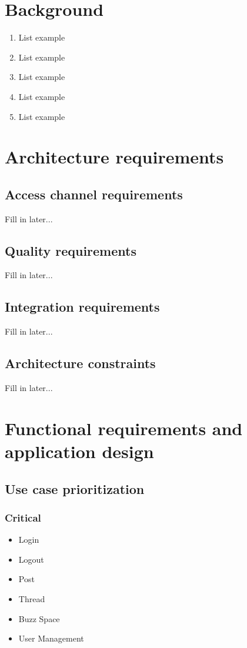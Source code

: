 \documentclass[12pt, oneside]{article}
\begin{document}
\section{Background}
	\begin{enumerate}
		\item List example
		\item List example
		\item List example
		\item List example
		\item List example
	\end{enumerate}
	
\section{Architecture requirements}
	\subsection{Access channel requirements}
		Fill in later...
	\subsection{Quality requirements}
		Fill in later...
	\subsection{Integration requirements}
		Fill in later...
	\subsection{Architecture constraints}
		Fill in later...
	
\section{Functional requirements and application design}
	\subsection{Use case prioritization}
		\subsubsection{Critical}
			\begin{itemize}
				\item Login
				\item Logout
				\item Post
				\item Thread
				\item Buzz Space
				\item User Management
			 \end{itemize}
\end{document}
